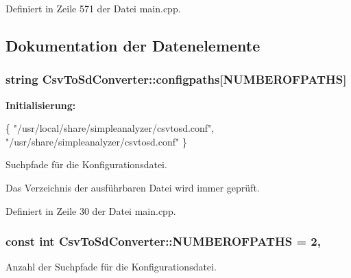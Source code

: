 Definiert in Zeile 571 der Datei main.\-cpp.



\subsection{Dokumentation der Datenelemente}
\hypertarget{classCsvToSdConverter_a185377b44506f75748a4d56bc372ee50}{
\subsubsection[{configpaths}]{\setlength{\rightskip}{0pt plus 5cm}string Csv\-To\-Sd\-Converter\-::configpaths\mbox{[}{\bf N\-U\-M\-B\-E\-R\-O\-F\-P\-A\-T\-H\-S}\mbox{]}\hspace{0.3cm}{\ttfamily [protected]}}}\label{classCsvToSdConverter_a185377b44506f75748a4d56bc372ee50}
{\bfseries Initialisierung\-:}
\begin{DoxyCode}
\{
            \textcolor{stringliteral}{"/usr/local/share/simpleanalyzer/csvtosd.conf"},
            \textcolor{stringliteral}{"/usr/share/simpleanalyzer/csvtosd.conf"} \}
\end{DoxyCode}


Suchpfade für die Konfigurationsdatei. 

Das Verzeichnis der ausführbaren Datei wird immer geprüft. 

Definiert in Zeile 30 der Datei main.\-cpp.

\hypertarget{classCsvToSdConverter_ad2278682506407d3172e8fca834891fe}{
\subsubsection[{N\-U\-M\-B\-E\-R\-O\-F\-P\-A\-T\-H\-S}]{\setlength{\rightskip}{0pt plus 5cm}const int Csv\-To\-Sd\-Converter\-::\-N\-U\-M\-B\-E\-R\-O\-F\-P\-A\-T\-H\-S = 2\hspace{0.3cm}{\ttfamily [static]}, {\ttfamily [protected]}}}\label{classCsvToSdConverter_ad2278682506407d3172e8fca834891fe}


Anzahl der Suchpfade für die Konfigurationsdatei. 



